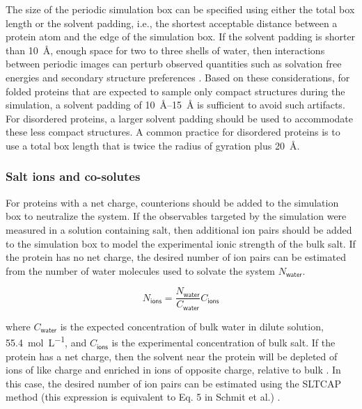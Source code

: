 \documentclass[9pt,review,pubversion]{livecoms}
\begin{document}
The size of the periodic simulation box can be specified using either the total box length or the solvent padding, i.e., the shortest acceptable distance between a protein atom and the edge of the simulation box.
If the solvent padding is shorter than \qty{10}{\angstrom}, enough space for two to three shells of water, then interactions between periodic images can perturb observed quantities such as solvation free energies and secondary structure preferences 
\cite{mehra_cell_2019,gapsys_importance_2020}.
Based on these considerations, for folded proteins that are expected to sample only compact structures during the simulation, a solvent padding of \qtyrange{10}{15}{\angstrom} is sufficient to avoid such artifacts.
For disordered proteins, a larger solvent padding should be used to accommodate these less compact structures.
A common practice for disordered proteins is to use a total box length that is twice the radius of gyration plus \qty{20}{\angstrom}.

\subsubsection{Salt ions and co-solutes}
\label{sub2:salt}

For proteins with a net charge, counterions should be added to the simulation box to neutralize the system.
If the observables targeted by the simulation were measured in a solution containing salt, then additional ion pairs should be added to the simulation box to model the experimental ionic strength of the bulk salt.
If the protein has no net charge, the desired number of ion pairs can be estimated from the number of water molecules used to solvate the system $N_{\mathsf{water}}$.

\begin{equation}
\label{eqn:ions_neutral}
N_{\mathsf{ions}} = \frac {N_{\mathsf{water}}} {C_{\mathsf{water}}} C_{\mathsf{ions}}
\end{equation}

\noindent where $C_{\mathsf{water}}$ is the expected concentration of bulk water in dilute solution, \qty{55.4}{\mol\per\liter}, and $C_{\mathsf{ions}}$ is the experimental concentration of bulk salt.
If the protein has a net charge, then the solvent near the protein will be depleted of ions of like charge and enriched in ions of opposite charge, relative to bulk \cite{schmit_sltcap_2018}.
In this case, the desired number of ion pairs can be estimated using the SLTCAP method (this expression is equivalent to Eq. 5 in Schmit et al.) \cite{schmit_sltcap_2018}.
\end{document}
